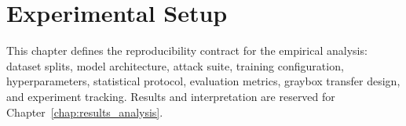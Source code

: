 \chapter{Experimental Setup}
\label{chap:experimental_setup}

This chapter defines the reproducibility contract for the empirical analysis:
dataset splits, model architecture, attack suite, training configuration,
hyperparameters, statistical protocol, evaluation metrics, graybox transfer
design, and experiment tracking. Results and interpretation are reserved for
Chapter~\ref{chap:results_analysis}.










